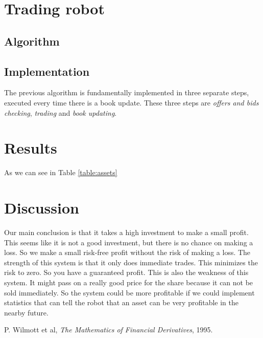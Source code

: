 \documentclass[8 pt]{article}
\begin{document}
\begin{multicols*}{2}

\section{Trading robot}

\subsection{Algorithm}



\subsection{Implementation}

The previous algorithm is fundamentally implemented in three separate steps, executed every time there is a book update. These three steps are \emph{offers and bids checking}, \emph{trading} and \emph{book updating}.

\section{Results}

As we can see in Table \ref{table:assets}

\section{Discussion}

Our main conclusion is that it takes a high investment to make a small profit. This seems like it is not a good investment, but there is no chance on making a loss. So we make a small risk-free profit without the risk of making a loss.
The strength of this system is that it only does immediate trades. This minimizes the risk to zero. So you have a guaranteed profit.
This is also the weakness of this system. It might pass on a really good price for the share because it can not be sold immediately. So the system could be more profitable if we could implement statistics that can tell the robot that an asset can be very profitable in the nearby future.

\begin{thebibliography}{28}
\raggedright
{}

 P. Wilmott et al, \emph{The Mathematics of Financial Derivatives}, 1995.

\end{thebibliography}

\end{multicols*}
\end{document}
